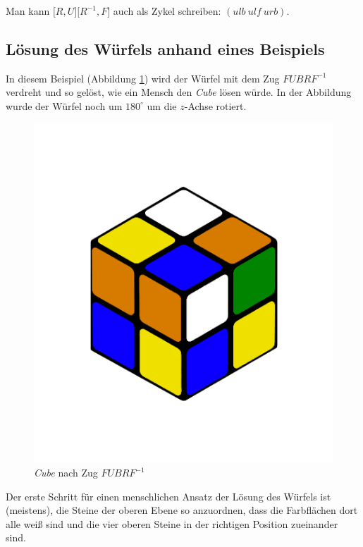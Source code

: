 \documentclass[12pt,a4paper, usenames, dvipsnames]{article}
\begin{document}
Man kann $\lbrack R, U \rbrack \lbrack R^{-1}, F \rbrack$ auch als Zykel schreiben: $(ulb \ ulf \ urb)$. 
%
%
%
%
%
%
%
%
%
%
%
%
%
%
%
%
%
%
%
%
\subsection*{Lösung des Würfels anhand eines Beispiels}

In diesem Beispiel (Abbildung \ref{18}) wird der Würfel mit dem Zug $FUBRF^{-1}$ verdreht und so gelöst, wie ein Mensch den \textit{Cube} lösen würde.
In der Abbildung wurde der Würfel noch um $180^\circ$ um die $z$-Achse rotiert.

\begin{figure}[h]
\centering
\includegraphics[scale=0.12]{LURFL1.png}
\caption{\textit{Cube} nach Zug $FUBRF^{-1}$ }
\label{18}
\end{figure}

Der erste Schritt für einen menschlichen Ansatz der Lösung des Würfels ist (meistens), die Steine der oberen Ebene so anzuordnen, dass die Farbflächen dort alle weiß sind und die vier oberen Steine in der richtigen Position zueinander sind. 
\end{document}
